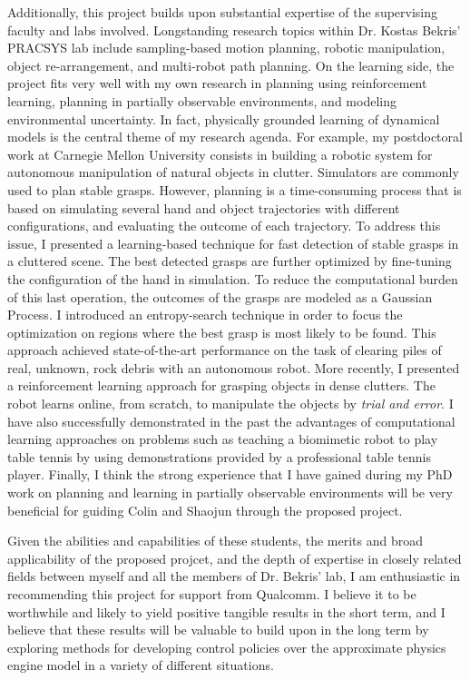 \documentclass{letter} %
\begin{document}
\begin{letter}{}
Additionally, this project builds upon substantial expertise of the supervising faculty and labs involved. 
Longstanding research topics within Dr. Kostas Bekris' PRACSYS lab include sampling-based motion planning, 
robotic manipulation, object re-arrangement, and multi-robot path planning. On the learning side, the project
fits very well with my own 
research in planning using reinforcement learning, planning in partially observable environments,
and modeling environmental uncertainty. In fact, physically grounded learning of dynamical models
is the central theme of my research agenda. For example, my postdoctoral work at Carnegie Mellon University 
consists in building a robotic system for autonomous manipulation
of natural objects in clutter. Simulators are commonly used to plan stable
grasps. However, planning is a time-consuming process that is based on simulating several hand
and object trajectories with different configurations, and evaluating the outcome of each trajectory. To address this
issue, I presented a learning-based technique for fast detection of stable grasps in a cluttered scene. The best detected
grasps are further optimized by fine-tuning the configuration of the hand in simulation. To reduce the computational
burden of this last operation, the outcomes of the grasps are modeled as a Gaussian Process. I introduced an entropy-search
technique in order to focus the optimization on regions where the best grasp is most likely to be found. This
approach achieved state-of-the-art performance on the task of clearing piles of real, unknown, rock debris with an
autonomous robot. More recently, I presented a reinforcement learning approach for grasping objects in dense clutters. The robot
learns online, from scratch, to manipulate the objects by {\it trial and error}. I have also successfully demonstrated in the past
the advantages of computational learning approaches on problems such as teaching a biomimetic robot to play table tennis by using demonstrations provided by a professional table tennis
player. Finally, I think the strong experience that I have gained during my PhD work on planning and learning in partially observable environments
will be very beneficial for guiding Colin and Shaojun through the proposed project.


Given the abilities and capabilities of these students, the merits and broad applicability of the proposed
projcet, and the depth of expertise in closely related fields between myself and all the members of
Dr. Bekris' lab, I am enthusiastic in recommending this project for support from Qualcomm. 
I believe it to be worthwhile and likely to yield positive tangible results in the short term, and I believe
that these results will be valuable to build upon in the long term by exploring methods
for developing control policies over the approximate physics engine model in a variety of different situations.


\end{letter}
\end{document}
